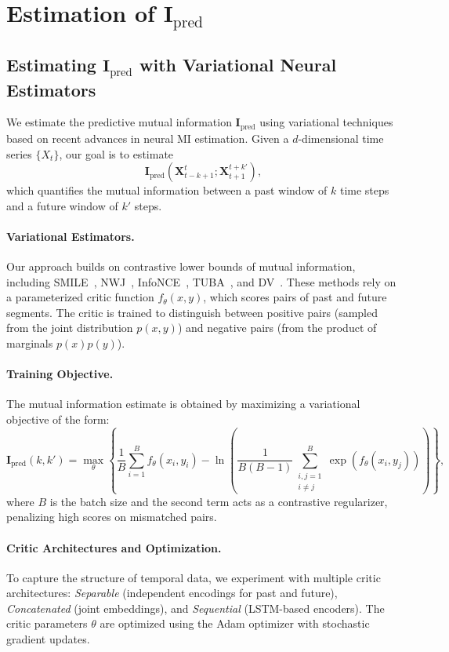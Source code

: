 \documentclass{article}
\begin{document}
\section{Estimation of $\mathbf{I}_{\text{pred}}$}
\label{appendix:partB}
\subsection{Estimating $\mathbf{I}_{\text{pred}}$ with Variational Neural Estimators}

We estimate the predictive mutual information $\mathbf{I}_{\text{pred}}$ using variational techniques based on recent advances in neural MI estimation. Given a $d$-dimensional time series $\{X_t\}$, our goal is to estimate
\[
\mathbf{I}_{\text{pred}}(\mathbf{X}_{t-k+1}^{t}; \mathbf{X}_{t+1}^{t+k'}),
\]
which quantifies the mutual information between a past window of $k$ time steps and a future window of $k'$ steps.

\paragraph{Variational Estimators.}
Our approach builds on contrastive lower bounds of mutual information, including SMILE~\cite{song2019understanding}, NWJ~\cite{nguyen2010estimating}, InfoNCE~\cite{oord2018}, TUBA~\cite{poole2019variational}, and DV~\cite{belghazi2018mine}. These methods rely on a parameterized critic function $f_\theta(x, y)$, which scores pairs of past and future segments. The critic is trained to distinguish between positive pairs (sampled from the joint distribution $p(x, y)$) and negative pairs (from the product of marginals $p(x)p(y)$).

\paragraph{Training Objective.}
The mutual information estimate is obtained by maximizing a variational objective of the form:
\begin{equation}
\mathbf{I}_{\text{pred}}(k, k') = \max_{\theta} \left\{
\frac{1}{B} \sum_{i=1}^{B} f_\theta(x_i, y_i)
- \ln \left( \frac{1}{B(B - 1)} \sum_{\substack{i,j=1 \\ i \ne j}}^B \exp(f_\theta(x_i, y_j)) \right)
\right\},
\label{eq:ipred}
\end{equation}
where $B$ is the batch size and the second term acts as a contrastive regularizer, penalizing high scores on mismatched pairs.

\paragraph{Critic Architectures and Optimization.}
To capture the structure of temporal data, we experiment with multiple critic architectures: \textit{Separable} (independent encodings for past and future), \textit{Concatenated} (joint embeddings), and \textit{Sequential} (LSTM-based encoders). The critic parameters $\theta$ are optimized using the Adam optimizer with stochastic gradient updates.
\end{document}
